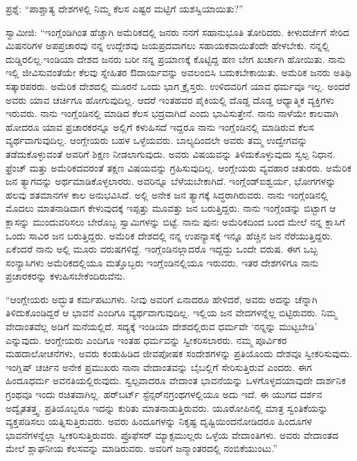 \vskip 0.1cm

ಪ್ರಶ್ನೆ: “ಪಾಶ್ಚಾತ್ಯ ದೇಶಗಳಲ್ಲಿ ನಿಮ್ಮ ಕೆಲಸ ಎಷ್ಟರ ಮಟ್ಟಿಗೆ ಯಶಸ್ವಿಯಾಯಿತು?”

\vskip 0.1cm

ಸ್ವಾಮೀಜಿ: “ಇಂಗ್ಲೆಂಡಿಗಿಂತ ಹೆಚ್ಚಾಗಿ ಅಮೆರಿಕದಲ್ಲಿ ಜನರು ನನಗೆ ಸಹಾನುಭೂತಿ ತೋರಿದರು. ಕೀಳುದರ್ಜೆಗೆ ಸೇರಿದ ಮಿಷನರಿಗಳ ಅಪಪ್ರಚಾರವು ನನ್ನ ಉದ್ದೇಶವು ಜಯಪ್ರದವಾಗಲು ಸಹಾಯಕವಾಯಿತೆಂದೇ ಹೇಳಬೇಕು. ನನ್ನಲ್ಲಿ ದುಡ್ಡಿರಲಿಲ್ಲ.\break ಇಂಡಿಯಾ ದೇಶದ ಜನರು ಬರೀ ನನ್ನ ಪ್ರಯಾಣಕ್ಕೆ ಕೊಟ್ಟಿದ್ದ ಹಣ ಬೇಗ ಖರ್ಚಾಗಿ ಹೋಯಿತು. ನಾನು ಇಲ್ಲಿ ಜೀವಿಸುವಂತೆಯೇ ಕೆಲವು ಸ್ನೇಹಿತರ ಔದಾರ್ಯವನ್ನು ಅವಲಂಬಿಸಿ ಬದುಕಬೇಕಾಯಿತು. ಅಮೆರಿಕ ಜನರು ಅತಿಥಿ ಸತ್ಕಾರಪರರು. ಅಮೆರಿಕ ದೇಶದಲ್ಲಿ ಮೂರನೆ ಒಂದು ಭಾಗ ಕ್ರೈಸ್ತರು. ಉಳಿದವರಿಗೆ ಯಾವ ಧರ್ಮವೂ ಇಲ್ಲ. ಅಂದರೆ ಅವರು ಯಾವ ಚರ್ಚಿಗೂ ಹೋಗುವುದಿಲ್ಲ. ಆದರೆ ಇಂತಹವರ ಪೈಕಿಯಲ್ಲಿ ದೊಡ್ಡ ದೊಡ್ಡ ಆಧ್ಯಾತ್ಮಿಕ ವ್ಯಕ್ತಿಗಳು ಇರುವರು. ನಾನು ಇಂಗ್ಲೆಂಡಿನಲ್ಲಿ ಮಾಡಿದ ಕೆಲಸ ಭದ್ರವಾಗಿದೆ ಎಂದು ಭಾವಿಸುತ್ತೇನೆ. ನಾನು ನಾಳೆಯೇ ಕಾಲವಾಗಿ ಹೋದರೂ ಯಾವ ಪ್ರಚಾರಕರನ್ನೂ ಅಲ್ಲಿಗೆ ಕಳುಹಿಸದೆ ಇದ್ದರೂ ನಾನು ಇಂಗ್ಲೆಂಡಿನಲ್ಲಿ ಮಾಡಿರುವ ಕೆಲಸ ವ್ಯರ್ಥವಾಗುವುದಿಲ್ಲ. ಆಂಗ್ಲೇಯರು ಬಹಳ ಒಳ್ಳೆಯವರು. ಬಾಲ್ಯದಿಂದಲೇ ಅವರು ತಮ್ಮ ಉದ್ವೇಗವನ್ನು ತಡೆದುಕೊಳ್ಳುವಂತೆ ಅವರಿಗೆ ಶಿಕ್ಷಣ ನೀಡಲಾಗುವುದು. ಅವರು ವಿಷಯವನ್ನು ತಿಳಿದುಕೊಳ್ಳುವುದು ಸ್ವಲ್ಪ ನಿಧಾನ. ಫ್ರೆಂಚ್​ ಮತ್ತು ಅಮೆರಿಕದವರಂತೆ ತಕ್ಷಣ ವಿಷಯವನ್ನು ಗ್ರಹಿಸುವುದಿಲ್ಲ. ಆಂಗ್ಲೇಯರು ವ್ಯವಹಾರ ಚತುರರು. ಅಮೆರಿಕ ಜನ ತ್ಯಾಗವನ್ನು ಅರ್ಥಮಾಡಿಕೊಳ್ಳಲಾರರು. ಅವರಿನ್ನೂ ಬೆಳೆಯಬೇಕಾಗಿದೆ. ಇಂಗ್ಲೆಂಡ್​ ಐಶ್ವರ್ಯ, ಭೋಗಗಳನ್ನು ಹಲವು ಶತಮಾನಗಳ ಕಾಲ ಅನುಭವಿಸಿದೆ. ಅಲ್ಲಿ ಅನೇಕ ಜನ ತ್ಯಾಗಕ್ಕೆ ಸಿದ್ಧರಾಗಿರುವರು. ನಾನು ಇಂಗ್ಲೆಂಡಿನಲ್ಲಿ ಮೊದಲು ಮಾತನಾಡಿದಾಗ ಕೇಳುವುದಕ್ಕೆ ಇಪ್ಪತ್ತು ಮೂವತ್ತು ಜನ ಬರುತ್ತಿದ್ದರು. ನಾನು ಇಂಗ್ಲೆಂಡನ್ನು ಬಿಟ್ಟಾಗ ಆ ಕ್ಲಾಸನ್ನು ಮುಂದುವರಿಸಲು ಬೇರೊಬ್ಬ ಸ್ವಾಮಿಗಳನ್ನು ಬಿಟ್ಟೆ. ನಾನು ಪುನಃ ಅಮೆರಿಕದಿಂದ ಬಂದ ಮೇಲೆ ನನ್ನ ಕ್ಲಾಸಿಗೆ ಒಂದು ಸಾವಿರ ಜನ ಬರುತ್ತಿದ್ದರು. ಅಮೆರಿಕ ದೇಶದಲ್ಲಿ ನನ್ನ ಉಪನ್ಯಾಸಕ್ಕೆ ಇನ್ನೂ ಹೆಚ್ಚಿನ ಜನ ನೆರೆಯುತ್ತಿದ್ದರು. ಏಕೆಂದರೆ ನಾನು ಅಲ್ಲಿ ಮೂರು ವರುಷಗಳಿದ್ದೆ. ಇಂಗ್ಲೆಂಡಿನಲ್ಲಾದರೊ ಇದ್ದದ್ದು ಒಂದೇ ವರುಷ. ಈಗ ಒಬ್ಬ ಸಂನ್ಯಾಸಿಗಳು ಅಮೆರಿಕದಲ್ಲಿಯೂ ಮತ್ತೊಬ್ಬರು ಇಂಗ್ಲೆಂಡಿನಲ್ಲಿಯೂ ಇರುವರು. ಇತರ ದೇಶಗಳಿಗೂ ನಾನು ಪ್ರಚಾರಕರನ್ನು ಕಳುಹಿಸಬೇಕೆಂದಿರುವೆನು.

\vskip 0.1cm

“ಆಂಗ್ಲೇಯರು ಅದ್ಭುತ ಕರ್ಮಪಟುಗಳು. ನೀವು ಅವರಿಗೆ ಏನಾದರೂ ಹೇಳಿದರೆ, ಅವರು ಅದನ್ನು ಚೆನ್ನಾಗಿ ತಿಳಿದುಕೊಂಡಿದ್ದರೆ ಆ ಭಾವನೆ ಎಂದಿಗೂ ವ್ಯರ್ಥವಾಗುವುದಿಲ್ಲ. ಇಲ್ಲಿಯ ಜನ ವೇದಗಳನ್ನೆಲ್ಲ ಬಿಟ್ಟಿರುವರು. ನಿಮ್ಮ ವೇದಾಂತವೆಲ್ಲ ಅಡಿಗೆ ಮನೆಯಲ್ಲಿದೆ. ಸದ್ಯಕ್ಕೆ ಇಂಡಿಯಾ ದೇಶದಲ್ಲಿರುವ ಧರ್ಮವೇ ‘ನನ್ನನ್ನು ಮುಟ್ಟಬೇಡಿ’ ಎನ್ನುವುದು. ಆಂಗ್ಲೇಯರು ಎಂದಿಗೂ ಇಂತಹ ಧರ್ಮವನ್ನು ಸ್ವೀಕರಿಸಲಾರರು. ನಮ್ಮ ಪೂರ್ವಿಕರ ಮಹದಾಲೋಚನೆಗಳು, ಅವರು ಕಂಡುಹಿಡಿದ ಜೀವಪೋಷಕ ಸಂದೇಶಗಳನ್ನು ಪ್ರತಿಯೊಂದು ದೇಶವೂ ಸ್ವೀಕರಿಸುವುದು. ಇಂಗ್ಲಿಷ್​ ಚರ್ಚಿನ ಅನೇಕ ಪ್ರಮುಖರು ನಾನಾ ವೇದಾಂತವನ್ನು ಬೈಬಲ್ಲಿಗೆ ಸೇರಿಸುತ್ತಿರುವೆ ಎಂದರು. ಈಗ ಹಿಂದೂಧರ್ಮ ಅವನತಿಯಲ್ಲಿರುವುದು. ಸ್ವಲ್ಪವಾದರೂ ವೇದಾಂತ ಭಾವನೆಯನ್ನು ಒಳಗೊಳ್ಳದ\break ಯಾವುದೇ ದಾರ್ಶನಿಕ ಗ್ರಂಥವೂ ಇಂದು ರಚಿತವಾಗಿಲ್ಲ. ಹರ್​ಬರ್ಟ್​ ಸ್ಟೆನ್ಸರ್​ನ\break ಗ್ರಂಥಗಳಲ್ಲಿಯೂ ಅದು ಇದೆ. ಈ ಯುಗದ ದರ್ಶನ ಅದ್ವೈತತತ್ತ್ವ. ಪ್ರತಿಯೊಬ್ಬರೂ ಇದನ್ನು ಕುರಿತು ಮಾತನಾಡುತ್ತಿರುವರು. ಯೂರೋಪಿನಲ್ಲಿ ಮಾತ್ರ ಸ್ವಂತಿಕೆಯನ್ನು ವ್ಯಕ್ತಪಡಿಸಲು ಯತ್ನಿಸುತ್ತಿರುವರು. ಅವರು ಹಿಂದೂಗಳನ್ನು ನಿಕೃಷ್ಟ ದೃಷ್ಟಿಯಿಂದ\break ನೋಡಿದರೂ ಹಿಂದೂಗಳ ಭಾವನೆಗಳನ್ನೆಲ್ಲಾ ಸ್ವೀಕರಿಸುತ್ತಿರುವರು. ಪ್ರೊಫೆಸರ್​ ಮ್ಯಾಕ್ಸಮುಲ್ಲರು ಒಳ್ಳೆಯ ವೇದಾಂತಿಗಳು. ಅವರು ವೇದಾಂತದ ಮೇಲೆ ಶ್ಲಾಘನೀಯ ಕೆಲಸವನ್ನು ಮಾಡಿರುವರು. ಅವರಿಗೆ ಜನ್ಮಾಂತರದಲ್ಲಿ ನಂಬಿಕೆಯುಂಟು.”

